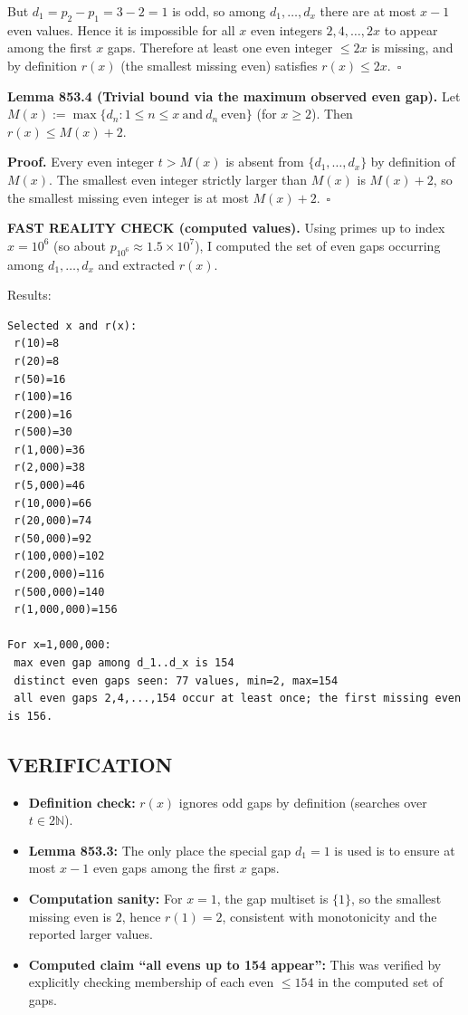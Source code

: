 But $d_1=p_2-p_1=3-2=1$ is odd, so among $d_1,\dots,d_x$ there are at most $x-1$ even values. Hence it is impossible for all $x$ even integers $2,4,\dots,2x$ to appear among the first $x$ gaps. Therefore at least one even integer $\le 2x$ is missing, and by definition $r(x)$ (the smallest missing even) satisfies $r(x)\le 2x$.\ $\square$

\medskip
\textbf{Lemma 853.4 (Trivial bound via the maximum observed even gap).}
Let $M(x):=\max\{d_n:1\le n\le x\ \text{and}\ d_n\ \text{even}\}$ (for $x\ge 2$). Then $r(x)\le M(x)+2$.

\textbf{Proof.}
Every even integer $t>M(x)$ is absent from $\{d_1,\dots,d_x\}$ by definition of $M(x)$. The smallest even integer strictly larger than $M(x)$ is $M(x)+2$, so the smallest missing even integer is at most $M(x)+2$.\ $\square$

\medskip
\textbf{FAST REALITY CHECK (computed values).}
Using primes up to index $x=10^6$ (so about $p_{10^6}\approx 1.5\times 10^7$), I computed the set of even gaps occurring among $d_1,\dots,d_x$ and extracted $r(x)$.

Results:
\begin{verbatim}
Selected x and r(x):
 r(10)=8
 r(20)=8
 r(50)=16
 r(100)=16
 r(200)=16
 r(500)=30
 r(1,000)=36
 r(2,000)=38
 r(5,000)=46
 r(10,000)=66
 r(20,000)=74
 r(50,000)=92
 r(100,000)=102
 r(200,000)=116
 r(500,000)=140
 r(1,000,000)=156

For x=1,000,000:
 max even gap among d_1..d_x is 154
 distinct even gaps seen: 77 values, min=2, max=154
 all even gaps 2,4,...,154 occur at least once; the first missing even is 156.
\end{verbatim}

\subsection*{VERIFICATION}
\begin{itemize}
\item \textbf{Definition check:} $r(x)$ ignores odd gaps by definition (searches over $t\in 2\mathbb{N}$).
\item \textbf{Lemma 853.3:} The only place the special gap $d_1=1$ is used is to ensure at most $x-1$ even gaps among the first $x$ gaps.
\item \textbf{Computation sanity:} For $x=1$, the gap multiset is $\{1\}$, so the smallest missing even is $2$, hence $r(1)=2$, consistent with monotonicity and the reported larger values.
\item \textbf{Computed claim ``all evens up to 154 appear'':} This was verified by explicitly checking membership of each even $\le 154$ in the computed set of gaps.
\end{itemize}

